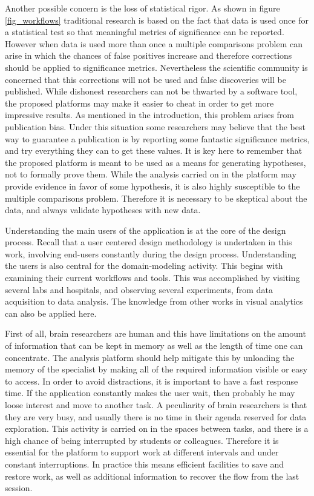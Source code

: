 Another possible concern is the loss of statistical rigor. As shown in figure \ref{fig_workflows} traditional research is based on the fact that data is used once for a statistical test so that meaningful metrics of significance can be reported. However when data is used more than once a multiple comparisons problem can arise in which the chances of false positives increase and therefore corrections should be applied to significance metrics. Nevertheless the scientific community is concerned that this corrections will not be used and false discoveries will be published. While dishonest researchers can not be thwarted by a software tool, the proposed platforms may make it easier to cheat in order to get more impressive results. As mentioned in the introduction, this problem arises from publication bias. Under this situation some researchers may believe that the best way to guarantee a publication is by reporting some fantastic significance metrics, and try everything they can to get these values. It is key here to remember that the proposed platform is meant to be used as a means for generating hypotheses, not to formally prove them. While the analysis carried on in the platform may provide evidence in favor of some hypothesis, it is also highly susceptible to the multiple comparisons problem. Therefore it is necessary to be skeptical about the data, and always validate hypotheses with new data.  

Understanding the main users of the application is at the core of the design process. Recall that a user centered design methodology is undertaken in this work, involving end-users constantly during the design process. Understanding the users is also central for the domain-modeling activity. This begins with examining their current workflows and tools. This was accomplished by visiting several labs and hospitals, and observing several experiments, from data acquisition to data analysis. The knowledge from other works in visual analytics can also be applied here. 

First of all, brain researchers are human and this have limitations on the amount of information that can be kept in memory as well as the length of time one can concentrate. The analysis platform should help mitigate this by unloading the memory of the specialist by making all of the required information visible or easy to access. In order to avoid distractions, it is important to have a fast response time. If the application constantly makes the user wait, then probably he may loose interest and move to another task. A peculiarity of brain researchers is that they are very busy, and usually there is no time in their agenda reserved for data exploration. This activity is carried on in the spaces between tasks, and there is a high chance of being interrupted by students or colleagues. Therefore it is essential for the platform to support work at different intervals and under constant interruptions. In practice this means efficient facilities to save and restore work, as well as additional information to recover the flow from the last session. 

